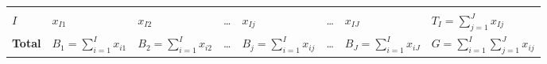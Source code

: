 \documentclass[
]{book}
\begin{document}
\begin{longtable}[]{@{}llllllll@{}}
\begin{minipage}[t]{0.03\columnwidth}
\strut
\end{minipage} & \begin{minipage}[t]{0.15\columnwidth}\raggedright
\strut
\end{minipage}\tabularnewline
\begin{minipage}[t]{0.33\columnwidth}\raggedright
\(I\)\strut
\end{minipage} & \begin{minipage}[t]{0.03\columnwidth}\raggedright
\(x_{I1}\)\strut
\end{minipage} & \begin{minipage}[t]{0.03\columnwidth}\raggedright
\(x_{I2}\)\strut
\end{minipage} & \begin{minipage}[t]{0.09\columnwidth}\raggedright
\ldots{}\strut
\end{minipage} & \begin{minipage}[t]{0.03\columnwidth}\raggedright
\(x_{Ij}\)\strut
\end{minipage} & \begin{minipage}[t]{0.09\columnwidth}\raggedright
\ldots{}\strut
\end{minipage} & \begin{minipage}[t]{0.03\columnwidth}\raggedright
\(x_{IJ}\)\strut
\end{minipage} & \begin{minipage}[t]{0.15\columnwidth}\raggedright
\(T_I=\sum_{j=1}^Jx_{Ij}\)\strut
\end{minipage}\tabularnewline
\begin{minipage}[t]{0.33\columnwidth}\raggedright
\textbf{Total}\strut
\end{minipage} & \begin{minipage}[t]{0.03\columnwidth}\raggedright
\(B_1=\sum_{i=1}^Ix_{i1}\)\strut
\end{minipage} & \begin{minipage}[t]{0.03\columnwidth}\raggedright
\(B_2=\sum_{i=1}^Ix_{i2}\)\strut
\end{minipage} & \begin{minipage}[t]{0.09\columnwidth}\raggedright
\ldots{}\strut
\end{minipage} & \begin{minipage}[t]{0.03\columnwidth}\raggedright
\(B_j=\sum_{i=1}^Ix_{ij}\)\strut
\end{minipage} & \begin{minipage}[t]{0.09\columnwidth}\raggedright
\ldots{}\strut
\end{minipage} & \begin{minipage}[t]{0.03\columnwidth}\raggedright
\(B_J=\sum_{i=1}^Ix_{iJ}\)\strut
\end{minipage} & \begin{minipage}[t]{0.15\columnwidth}\raggedright
\(G=\sum_{i=1}^I\sum_{j=1}^Jx_{ij}\)\strut
\end{minipage}\tabularnewline
\bottomrule
\end{longtable}
\end{document}
